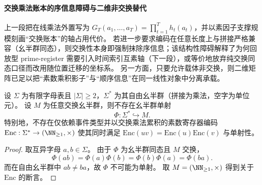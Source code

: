 \paragraph{交换乘法账本的序信息障碍与二维非交换替代}
上一段把在线乘法外置写为 \(G_T(a_1,\dots,a_T)=\prod_{t=1}^{T}h_t(a_t)\)，并以素因子支撑规模刻画“交换账本”的轴占用代价。
若进一步要求编码在任意长度上与拼接严格兼容（幺半群同态），则交换性本身即强制抹除序信息；该结构性障碍解释了为何回放型 prime-register 需要引入时间索引互素轴（下一段），或等价地放弃纯交换同态口径而改用随位置迁移的坐标系。
另一方面，只要允许载体非交换，则二维矩阵已足以把“素数乘积影子”与“顺序信息”在同一线性对象中分离承载。

\begin{theorem}[交换型素数寄存器对序信息的不可恢复性]\label{thm:pom-commutative-prime-register-order-nonrecoverable}
设 \(\Sigma\) 为有限字母表且 \(|\Sigma|\ge 2\)，\(\Sigma^{*}\) 为其自由幺半群（拼接为乘法，空字为单位元）。
设 \(M\) 为任意交换幺半群，则不存在幺半群单射
\[
\Phi:\Sigma^{*}\hookrightarrow M.
\]
特别地，不存在仅依赖事件类型并以交换乘法累积的素数寄存器编码
\(\mathrm{Enc}:\Sigma^{*}\to(\NN_{\ge 1},\times)\)
使其同时满足 \(\mathrm{Enc}(uv)=\mathrm{Enc}(u)\mathrm{Enc}(v)\) 与单射性。
\end{theorem}
\begin{proof}
取互异字母 \(a,b\in\Sigma\)。
由于 \(\Phi\) 为幺半群同态且 \(M\) 交换，
\[
\Phi(ab)=\Phi(a)\Phi(b)=\Phi(b)\Phi(a)=\Phi(ba).
\]
而在自由幺半群中 \(ab\neq ba\)，故 \(\Phi\) 不可能为单射。
取 \(M=(\NN_{\ge 1},\times)\) 得到关于 \(\mathrm{Enc}\) 的断言。
\end{proof}


